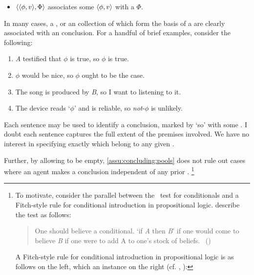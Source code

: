 \begin{note}
  \begin{itemize}[leftmargin=*]
  \item
    \(\langle \langle \phi, v \rangle, \Phi \rangle\) associates some \evalN{} \(\langle \phi, v \rangle\) with a \pool{} \(\Phi\).
  \end{itemize}

  In many cases, a \pool{}, or an collection of \evalN{} which form the basis of a \pool{} are clearly associated with an conclusion.
  For a handful of brief examples, consider the following:

  \begin{enumerate}[label=\arabic*., ref=(\arabic*), noitemsep]
  \item
    \emph{A} testified that \(\phi\) is true, so \(\phi\) is true.
  \item
    \(\phi\) would be nice, so \(\phi\) ought to be the case.
  \item
    The song is produced by \emph{B}, so I want to listening to it.
  \item
    The device reads `\(\phi\)' and is reliable, so \emph{not}-\(\phi\) is unlikely.
  \end{enumerate}

  Each sentence may be used to identify a conclusion, marked by `so' with some \pool{}.
  I doubt each sentence captures the full extent of the premises involved.
  We have no interest in specifying exactly which \evalN{} belong to any given \pool{}.

  Further, by allowing  to be empty, \autoref{assu:concluding:pools} does not rule out cases where an agent makes a conclusion independent of any prior .%
  \footnote{
    To motivate, consider the parallel between the~\citeauthor{Ramsey:1929tf} test for conditionals and a Fitch-style rule for conditional introduction in propositional logic.
    \textcite{Read:1995wf} describe the test as follows:

    \begin{quote}
      One should believe a conditional. `if \emph{A} then \emph{B}' if one would come to believe \emph{B} if one were to add A to one's stock of beliefs.%
      \mbox{ }\hfill\mbox{(\citeyear[47]{Read:1995wf})}
    \end{quote}

    A Fitch-style rule for conditional introduction in propositional logic is as follows on the left, which an instance on the right (cf. \cite[206]{Barwise:1999tu}, \cite{Pelletier:2021vp}):

}
\end{note}
